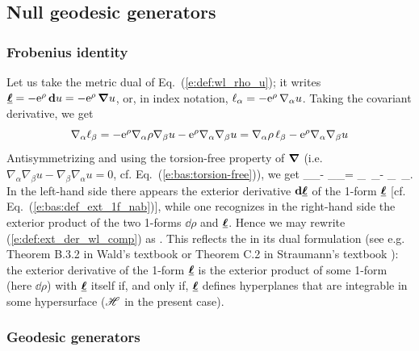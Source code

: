 \subsection{Null geodesic generators} \label{s:def:null_geod_gen}

\subsubsection{Frobenius identity} \label{s:def:Frobenius}

Let us take the metric dual of Eq.~(\ref{e:def:wl_rho_u}); it writes
$\underline{\bm{\ell}} = - \mathrm{e}^\rho \, \mathbf{d} u = - \mathrm{e}^\rho \, \bm{\nabla} u $, or, in index notation,
$\ell_\alpha = - \mathrm{e}^\rho \, \nabla_\alpha u$.
Taking the covariant derivative, we get
\[
    \nabla_\alpha \ell_\beta = - \mathrm{e}^\rho \nabla_\alpha \rho \nabla_\beta u
                -   \mathrm{e}^\rho  \nabla_\alpha \nabla_\beta u
                 = \nabla_\alpha \rho \, \ell_\beta - \mathrm{e}^\rho  \nabla_\alpha \nabla_\beta u
\]
Antisymmetrizing and using the torsion-free property of $\bm{\nabla}$ (i.e.
$\nabla_\alpha \nabla_\beta u - \nabla_\beta \nabla_\alpha u = 0$, cf.
Eq.~(\ref{e:bas:torsion-free})), we get
\be \label{e:def:ext_der_wl_comp}
  \nabla_\alpha \el_\beta - \nabla_\beta \el_\alpha =
  \nabla_\alpha \rho \, \el_\beta -  \nabla_\beta \rho \, \el_\alpha  .
\ee
In the left-hand side there appears the exterior derivative $\mathbf{d}\underline{\bm{\ell}}$ of
the 1-form $\underline{\bm{\ell}}$ [cf. Eq.~(\ref{e:bas:def_ext_1f_nab})],
while one recognizes in the right-hand side the exterior product  of
the two 1-forms $\dd\rho$ and $\underline{\bm{\ell}}$. Hence we may rewrite (\ref{e:def:ext_der_wl_comp})
as
\be
    \encadre{ \dd \uu{\el} = \dd\rho \wedge \uu{\el} } .
\ee
This reflects the 
in its dual formulation (see e.g.
Theorem B.3.2 in Wald's textbook \cite{Wald84} or Theorem C.2 in
Straumann's textbook \cite{Strau13}):
the exterior derivative of
the 1-form $\underline{\bm{\ell}}$ is the exterior product of
some 1-form (here $\dd\rho$) with $\underline{\bm{\ell}}$ itself if, and only if,
$\underline{\bm{\ell}}$ defines hyperplanes that are integrable in some hypersurface ($\mathscr{H}$ in the present case).

\subsubsection{Geodesic generators} \label{s:def:geod_gener}

